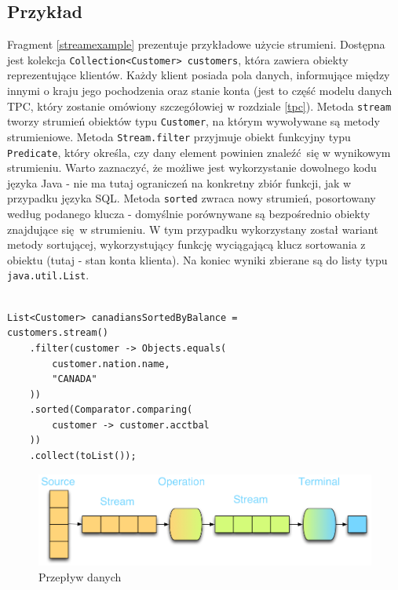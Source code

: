 \documentclass[12pt]{extarticle}
\begin{document}
\subsection{Przykład}

    Fragment \ref{streamexample} prezentuje przykładowe użycie strumieni. Dostępna jest kolekcja \newline \texttt{Collection<Customer> customers}, która zawiera obiekty reprezentujące klientów. Każdy klient posiada pola danych, informujące między innymi o kraju jego pochodzenia oraz stanie konta (jest to część modelu danych TPC, który zostanie omówiony szczegółowiej w rozdziale \ref{tpc}). Metoda \texttt{stream} tworzy strumień obiektów typu \texttt{Customer}, na którym wywoływane są metody strumieniowe. Metoda \texttt{Stream.filter} przyjmuje obiekt funkcyjny typu \texttt{Predicate}, który określa, czy dany element powinien znaleźć się w wynikowym strumieniu. Warto zaznaczyć, że możliwe jest wykorzystanie dowolnego kodu języka Java - nie ma tutaj ograniczeń na konkretny zbiór funkcji, jak w przypadku języka SQL. Metoda \texttt{sorted} zwraca nowy strumień, posortowany według podanego klucza - domyślnie porównywane są bezpośrednio obiekty znajdujące się w strumieniu. W tym przypadku wykorzystany został wariant metody sortującej, wykorzystujący funkcję wyciągającą klucz sortowania z obiektu (tutaj - stan konta klienta). Na koniec wyniki zbierane są do listy typu \texttt{java.util.List}. 

\begin{lstlisting}[label=streamexample, caption=Przykładowe wykorzystanie Stream API]

List<Customer> canadiansSortedByBalance = 
customers.stream()
    .filter(customer -> Objects.equals(
        customer.nation.name,
        "CANADA"
    ))
    .sorted(Comparator.comparing(
        customer -> customer.acctbal
    ))
    .collect(toList());

\end{lstlisting}

\begin{figure}
\centering
\includegraphics[width=14cm]{flow.png}
\caption{Przepływ danych}
\label{fig:flow}
\end{figure}
\end{document}
